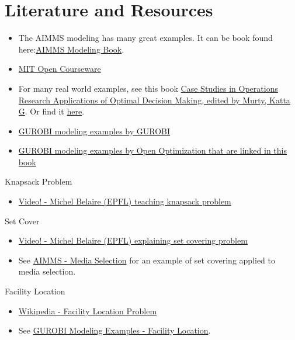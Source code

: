 \section{Literature and Resources}

\begin{resource}

\begin{itemize}
\item The AIMMS modeling has many great examples.  It can be book found here:\href{https://www.aimms.com/english/developers/resources/manuals/optimization-modeling}{AIMMS Modeling Book}.
\item \href{http://web.mit.edu/15.053/www/AMP-Chapter-09.pdf}{MIT Open Courseware}
\item  For many real world examples, see this book \href{https://link-springer-com.ezproxy.lib.vt.edu/book/10.1007/978-1-4939-1007-6}{
Case Studies in Operations Research
Applications of Optimal Decision Making, edited by  Murty, Katta G}.
Or find it \href{https://www.springer.com/gp/book/9781493910069}{here}.
\item \href{https://github.com/Gurobi/modeling-examples}{GUROBI modeling examples by GUROBI}
\item \href{https://github.com/open-optimization/open-optimization-or-examples/tree/master/integer-programming}{GUROBI modeling examples by Open Optimization that are linked in this book}
\end{itemize}

Knapsack Problem
\begin{itemize}
\item \href{https://www.youtube.com/watch?v=GteOoMGUOdY}{Video! - Michel Belaire (EPFL) teaching knapsack problem}
\end{itemize}

Set Cover
\begin{itemize}
\item \href{https://www.youtube.com/watch?v=cjSeHSjPmsk}{Video! - Michel Belaire (EPFL) explaining set covering problem}
\item See \href{https://download.aimms.com/aimms/download/manuals/AIMMS3OM_MediaSelection.pdf}{AIMMS - Media Selection} for an example of set covering applied to media selection.
\end{itemize}

Facility Location
\begin{itemize}
\item \href{https://en.wikipedia.org/wiki/Facility_location_problem}{Wikipedia - Facility Location Problem}
\item See \href{https://github.com/Gurobi/modeling-examples/tree/master/facility_location}{GUROBI Modeling Examples - Facility Location}.
\end{itemize}


\end{resource}
